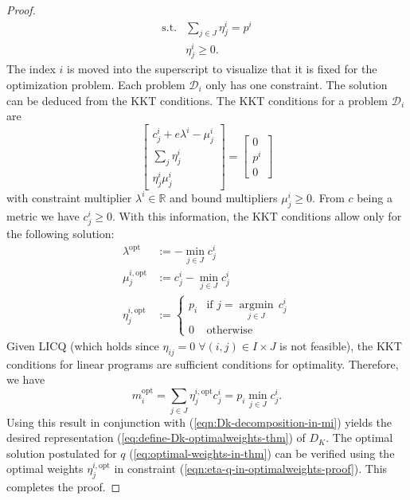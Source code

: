 \begin{proof}
\begin{subequations}
\begin{align}
  \text{s.t.}&\sum_{j\in J}\eta_j^i = p^i\\
  &\eta_j^i\geq 0.
\end{align}
\end{subequations}
The index $i$ is moved into the superscript to visualize that it is fixed for the optimization problem.
Each problem $\mathcal{D}_i$ only has one constraint.
The solution can be deduced from the KKT conditions.
The KKT conditions for a problem $\mathcal{D}_i$ are
\begin{equation}
  \label{eq:D-i-KKT-in-optimalweightsproof}
  \left[
  \begin{array}{c}
  c_j^i + e\lambda^i -\mu_j^i\\
  \sum_{j}\eta_j^i\\
  \eta_j^i\mu_j^i
  \end{array}
  \right]
  = \left[
    \begin{array}{c}
      0\\p^i\\0
    \end{array}
\right]
\end{equation}
with constraint multiplier $\lambda^i\in\mathbb{R}$ and bound multipliers $\mu_j^i\geq 0$.
From $c$ being a metric we have $c_j^i\geq 0$.
With this information, the KKT conditions allow only for the following solution:
\begin{subequations}
\begin{align}
  \label{eq:optimal-eta-optmimalweightsproof}
  \lambda^{\mathrm{opt}} &:= -\min\limits_{j\in J}c_j^i\\
  \mu_j^{i,\mathrm{opt}} &:= c_j^i - \min\limits_{j\in J}c_j^i\\
  \eta_j^{i,\mathrm{opt}} &:= \left\{ \begin{array}{lr}p_i&\text{if }j=\underset{j\in J}{\operatorname{argmin}}\, c_j^i\\0&\text{otherwise}\end{array}\right.
\end{align}
\end{subequations}
Given LICQ (which holds since $\eta_{ij}=0\;\forall (i,j)\in I\times J$ is not feasible), the KKT conditions for linear programs are sufficient conditions for optimality.
Therefore, we have
\begin{equation}
  m_i^{\mathrm{opt}} = \sum_{j\in J}\eta_j^{i,\mathrm{opt}}c_j^i = p_i\min\limits_{j\in J}c_j^i.
\end{equation}
Using this result in conjunction with (\ref{eqn:Dk-decomposition-in-mi}) yields the desired representation (\ref{eq:define-Dk-optimalweights-thm}) of $D_K$.
The optimal solution postulated for $q$ (\ref{eq:optimal-weights-in-thm}) can be verified using the optimal weights $\eta_j^{i,\mathrm{opt}}$ in constraint (\ref{eqn:eta-q-in-optimalweights-proof}).
This completes the proof.
\end{proof}
